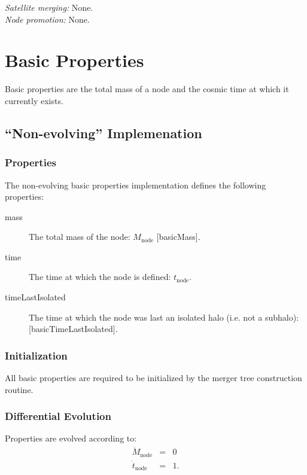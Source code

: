 \noindent\emph{Satellite merging:} None.\\

\noindent\emph{Node promotion:} None.\\

\section{Basic Properties}\label{sec:ComponentBasicProperties}

Basic properties are the total mass of a \gls{node} and the cosmic time at which it currently exists.

\subsection{``Non-evolving'' Implemenation}

\subsubsection{Properties}

The non-evolving basic properties implementation defines the following properties:
\begin{description}
 \item [{\normalfont \ttfamily mass}] The total mass of the node: $M_\mathrm{node}$ [{\normalfont \ttfamily basicMass}].
 \item [{\normalfont \ttfamily time}] The time at which the \gls{node} is defined: $t_\mathrm{node}$.
 \item [{\normalfont \ttfamily timeLastIsolated}] The time at which the \gls{node} was last an isolated halo (i.e. not a subhalo): [\normalfont \ttfamily basicTimeLastIsolated].
\end{description}

\subsubsection{Initialization}

All basic properties are required to be initialized by the merger tree construction routine.

\subsubsection{Differential Evolution}

Properties are evolved according to:
\begin{eqnarray}
 \dot{M}_\mathrm{node} &=& 0 \\
 \dot{t}_\mathrm{node} &=& 1.
\end{eqnarray}

